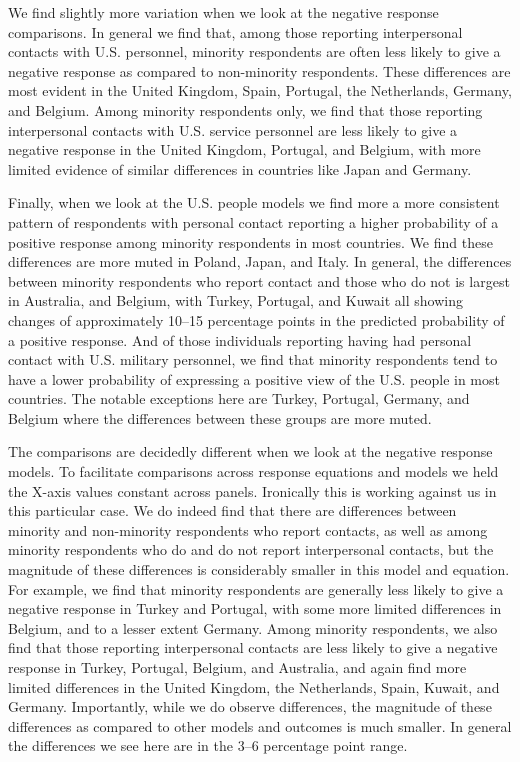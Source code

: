 We find slightly more variation when we look at the negative response comparisons. In general we find that, among those reporting interpersonal contacts with U.S. personnel, minority respondents are often less likely to give a negative response as compared to non-minority respondents. These differences are most evident in the United Kingdom, Spain, Portugal, the Netherlands, Germany, and Belgium. Among minority respondents only, we find that those reporting interpersonal contacts with U.S. service personnel are less likely to give a negative response in the United Kingdom, Portugal, and Belgium, with more limited evidence of similar differences in countries like Japan and Germany.

Finally, when we look at the U.S. people models we find more a more consistent pattern of respondents with personal contact reporting a higher probability of a positive response among minority respondents in most countries. We find these differences are more muted in Poland, Japan, and Italy. In general, the differences between minority respondents who report contact and those who do not is largest in Australia, and Belgium, with Turkey, Portugal, and Kuwait all showing changes of approximately 10--15 percentage points in the predicted probability of a positive response. And of those individuals reporting having had personal contact with U.S. military personnel, we find that minority respondents tend to have a lower probability of expressing a positive view of the U.S. people in most countries. The notable exceptions here are Turkey, Portugal, Germany, and Belgium where the differences between these groups are more muted.

The comparisons are decidedly different when we look at the negative response models. To facilitate comparisons across response equations and models we held the X-axis values constant across panels. Ironically this is working against us in this particular case. We do indeed find that there are differences between minority and non-minority respondents who report contacts, as well as among minority respondents who do and do not report interpersonal contacts, but the magnitude of these differences is considerably smaller in this model and equation. For example, we find that minority respondents are generally less likely to give a negative response in Turkey and Portugal, with some more limited differences in Belgium, and to a lesser extent Germany. Among minority respondents, we also find that those reporting interpersonal contacts are less likely to give a negative response in Turkey, Portugal, Belgium, and Australia, and again find more limited differences in the United Kingdom, the Netherlands, Spain, Kuwait, and Germany. Importantly, while we do observe differences, the magnitude of these differences as compared to other models and outcomes is much smaller. In general the differences we see here are in the 3--6 percentage point range. 

